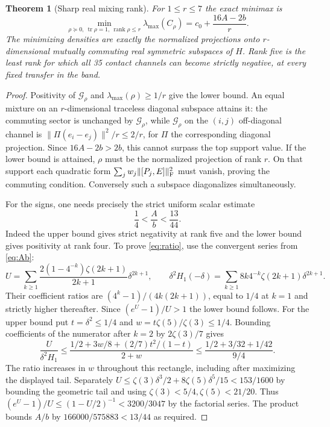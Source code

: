 \documentclass[11pt]{article}
\newtheorem{theorem}{Theorem}
\newcommand{\tr}{\operatorname{tr}}
\begin{document}
\begin{theorem}[Sharp real mixing rank]
For $1\le r\le 7$ the exact minimax is
\[
 \min_{\rho\succeq0,\ \tr\rho=1,\ \operatorname{rank}\rho\le r}
       \lambda_{\max}(C_\rho)=c_0+\frac{16A-2b}{r}.
\]
The minimizing densities are exactly the normalized projections onto
$r$-dimensional mutually commuting real symmetric subspaces of $H$.
Rank five is the least rank for which all 35 contact channels can
become strictly negative, at every fixed transfer in the band.
\end{theorem}
\begin{proof}
Positivity of $\mathcal G_\rho$ and $\lambda_{\max}(\rho)\ge1/r$
give the lower bound. An equal mixture on an $r$-dimensional
traceless diagonal subspace attains it: the commuting sector is
unchanged by $\mathcal G_\rho$, while
$\mathcal G_\rho$ on the $(i,j)$ off-diagonal channel is
$\|\Pi(e_i-e_j)\|^2/r\le2/r$, for $\Pi$ the corresponding diagonal
projection. Since $16A-2b>2b$, this cannot surpass the top support
value. If the lower bound is attained, $\rho$ must be the normalized
projection of rank $r$. On that support each quadratic form
$\sum_jw_j\|[P_j,E]\|_{\rm F}^2$ must vanish, proving the commuting
condition. Conversely such a subspace diagonalizes simultaneously.

For the signs, one needs precisely the strict uniform scalar estimate
\begin{equation}
  \frac14<\frac{A}{b}<\frac{13}{44}.
 \label{eq:ratio}
\end{equation}
Indeed the upper bound gives strict negativity at rank five and
the lower bound gives positivity at rank four. To prove \eqref{eq:ratio}, use
the convergent series from \eqref{eq:Ab}:
\[
 U=\sum_{k\ge1}\frac{2(1-4^{-k})\zeta(2k+1)}{2k+1}\delta^{2k+1},
 \qquad
 \delta^2H_1(-\delta)=\sum_{k\ge1}8k4^{-k}\zeta(2k+1)\delta^{2k+1}.
\]
Their coefficient ratios are
$(4^k-1)/(4k(2k+1))$, equal to $1/4$ at $k=1$ and
strictly higher thereafter. Since $(e^U-1)/U>1$ the lower bound follows.
For the upper bound put $t=\delta^2\le1/4$ and
$w=t\zeta(5)/\zeta(3)\le1/4$. Bounding coefficients of the
numerator after $k=2$ by $2\zeta(3)/7$ gives
\[
 \frac{U}{\delta^2 H_1}
 \le \frac{1/2+3w/8+(2/7)t^2/(1-t)}{2+w}
 \le \frac{1/2+3/32+1/42}{9/4}.
\]
The ratio increases in $w$ throughout this rectangle, including
after maximizing the displayed tail. Separately
$U\le\zeta(3)\delta^3/2+8\zeta(5)\delta^5/15<153/1600$
by bounding the geometric tail and using
$\zeta(3)<5/4,\zeta(5)<21/20$.
Thus $(e^U-1)/U\le (1-U/2)^{-1}<3200/3047$ by the
factorial series. The product bounds $A/b$ by
$166000/575883<13/44$ as required.
\end{proof}
\end{document}
